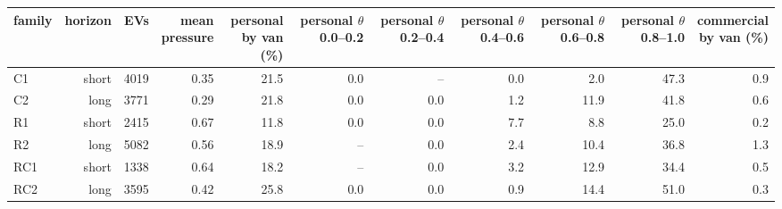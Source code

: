 \begin{tabular}{lrrrrrrrrrr}\toprule
family & horizon & EVs & \shortstack{mean\\pressure} & \shortstack{personal\\by van (\%)} & \shortstack{personal\\$\theta$ 0.0--0.2} & \shortstack{personal\\$\theta$ 0.2--0.4} & \shortstack{personal\\$\theta$ 0.4--0.6} & \shortstack{personal\\$\theta$ 0.6--0.8} & \shortstack{personal\\$\theta$ 0.8--1.0} & \shortstack{commercial\\by van (\%)} \\ \midrule
C1 & short & 4019 & 0.35 & 21.5 & 0.0 & -- & 0.0 & 2.0 & 47.3 & 0.9 \\
C2 & long & 3771 & 0.29 & 21.8 & 0.0 & 0.0 & 1.2 & 11.9 & 41.8 & 0.6 \\
R1 & short & 2415 & 0.67 & 11.8 & 0.0 & 0.0 & 7.7 & 8.8 & 25.0 & 0.2 \\
R2 & long & 5082 & 0.56 & 18.9 & -- & 0.0 & 2.4 & 10.4 & 36.8 & 1.3 \\
RC1 & short & 1338 & 0.64 & 18.2 & -- & 0.0 & 3.2 & 12.9 & 34.4 & 0.5 \\
RC2 & long & 3595 & 0.42 & 25.8 & 0.0 & 0.0 & 0.9 & 14.4 & 51.0 & 0.3 \\
\bottomrule\end{tabular}
